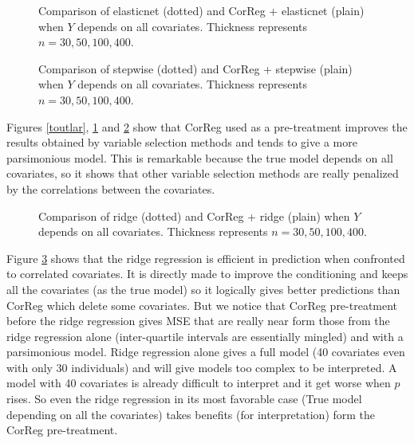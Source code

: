 \documentclass[11pt,a4paper]{article}
\begin{document}
\begin{figure}[h!]
	 \quad
	\caption{Comparison of elasticnet (dotted) and CorReg + elasticnet (plain) when $Y$ depends on all covariates. Thickness represents $n=30,50,100,400$.}\label{toutelast}
\end{figure}


\begin{figure}[h!]
	 \quad
	\caption{Comparison of stepwise (dotted) and CorReg + stepwise (plain) when $Y$ depends on all covariates. Thickness represents $n=30,50,100,400$.}\label{toutstepwise}
\end{figure}
Figures \ref{toutlar}, \ref{toutelast} and \ref{toutstepwise} show that CorReg used as a pre-treatment improves the results obtained by variable selection methods and tends to give a more parsimonious model. This is remarkable because the true model depends on all covariates, so it shows that other variable selection methods are really penalized by the correlations between the covariates.


 \begin{figure}[h!]
	 \quad
	\caption{Comparison of ridge (dotted) and CorReg + ridge (plain) when $Y$ depends on all covariates. Thickness represents $n=30,50,100,400$.}\label{toutridge}
\end{figure}
Figure \ref{toutridge} shows that the ridge regression is efficient in prediction when confronted to correlated covariates. It is directly made to improve the conditioning and keeps all the covariates (as the true model) so it logically gives better predictions than CorReg which delete some covariates. But we notice that CorReg pre-treatment before the ridge regression gives MSE that are really near form those from the ridge regression alone (inter-quartile intervals are essentially mingled) and with a parsimonious model.
Ridge regression alone gives a full model (40 covariates even with only 30 individuals) and will give models too complex to be interpreted. A model with 40 covariates is already difficult to interpret and it get worse when $p$ rises. So even the ridge regression in its most favorable case (True model depending on all the covariates) takes benefits (for interpretation) form the CorReg pre-treatment.
\FloatBarrier
\end{document}
